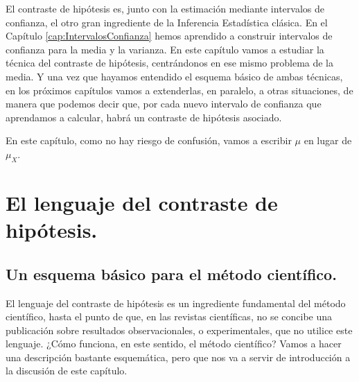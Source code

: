 

El contraste de hipótesis es, junto con la estimación mediante intervalos de confianza, el otro gran ingrediente de la Inferencia Estadística clásica. En el Capítulo \ref{cap:IntervalosConfianza} hemos aprendido a construir intervalos de confianza para la media y la varianza. En este capítulo vamos a estudiar la técnica del contraste de hipótesis, centrándonos en ese mismo problema de la media. Y una vez que hayamos entendido el esquema básico de ambas técnicas, en los próximos capítulos vamos a extenderlas, en paralelo, a otras situaciones, de manera que podemos decir que, por cada nuevo intervalo de confianza que aprendamos a calcular, habrá un contraste de hipótesis asociado.

 En este capítulo, como no hay riesgo de confusión, vamos a escribir $\mu$ en lugar de $\mu_X$.

\section{El lenguaje del contraste de hipótesis.}
\label{cap07:sec:LenguajeContrasteHipotesis}

\subsection{Un esquema básico para el método científico.}
\label{cap07:subsec:EsquemaBasicoMetodoCientifico}

El lenguaje del contraste de hipótesis es un ingrediente fundamental del método científico, hasta el punto de que, en las revistas científicas, no se concibe una publicación sobre resultados observacionales, o experimentales, que no utilice este lenguaje. ¿Cómo funciona, en este sentido, el método científico? Vamos a hacer una descripción bastante esquemática, pero que nos va a servir de introducción a la discusión de este capítulo.

